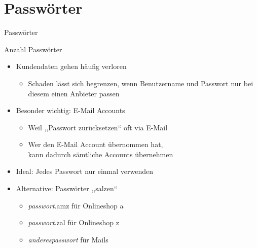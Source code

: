 \section{Passwörter}
  \begin{frame}{Passwörter}


  \end{frame}

  \begin{frame}{Anzahl Passwörter}
    \begin{itemize}
      \item Kundendaten gehen häufig verloren
      \begin{itemize}
        \item Schaden lässt sich begrenzen, wenn Benutzername und Passwort nur bei diesem einen Anbieter passen
      \end{itemize}
      \item Besonder wichtig: E-Mail Accounts
      \begin{itemize}
        \item Weil ,,Passwort zurücksetzen`` oft via E-Mail
        \item Wer den E-Mail Account übernommen hat,\\ kann dadurch sämtliche Accounts übernehmen
      \end{itemize}
      \item Ideal: Jedes Passwort nur einmal verwenden
      \item Alternative: Passwörter ,,salzen``
      \begin{itemize}
        \item \textit{passwort}.amz für Onlineshop a
        \item \textit{passwort}.zal für Onlineshop z
        \item \textit{anderespasswort} für Mails
      \end{itemize}
    \end{itemize}
  \end{frame}

